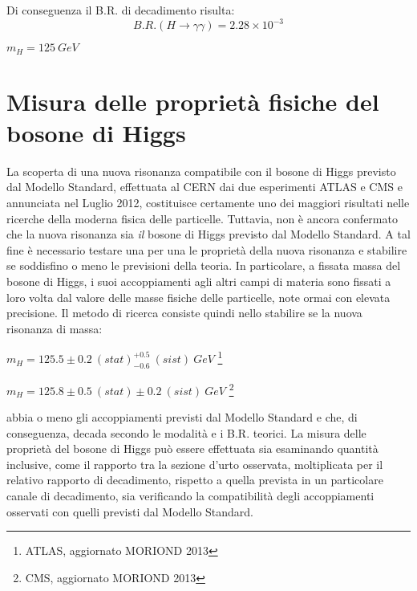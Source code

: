 Di conseguenza il B.R. di decadimento risulta:
\begin{equation}
 B.R.(H\rightarrow\gamma\gamma)= 2.28\times 10^{-3}
\end{equation}
\begin{center}
 $m_{H}=125 ~GeV$
\end{center}

\section{Misura delle proprietà fisiche del bosone di Higgs}
\medskip
La scoperta di una nuova risonanza compatibile con il bosone di Higgs previsto dal Modello Standard, effettuata al \ac{CERN} dai due esperimenti
ATLAS \cite{atlasHiggs} e CMS \cite{cmsHiggs} e annunciata nel Luglio 2012,
costituisce certamente uno dei maggiori risultati nelle ricerche della moderna fisica delle particelle.
\newline
Tuttavia, non è ancora confermato che la nuova risonanza sia \textit{il} bosone di Higgs previsto dal Modello Standard.
A tal fine è necessario testare
una per una le proprietà della nuova risonanza e stabilire se soddisfino o meno le previsioni della teoria.
\newline
In particolare, a fissata massa del bosone di Higgs, i suoi accoppiamenti agli altri campi di materia sono fissati a loro volta
dal valore delle masse fisiche delle particelle, note ormai con elevata precisione.
\newline 
Il metodo di ricerca consiste quindi nello stabilire se la nuova risonanza di massa:
\begin{center}
 $m_{H}=125.5 \pm 0.2 ~(stat) ^{+0.5}_{-0.6} ~(sist) ~GeV$ \footnote{ATLAS, aggiornato MORIOND 2013 }
\end{center}
\begin{center}
$m_{H}=125.8 \pm 0.5 ~(stat) \pm 0.2 ~(sist) ~GeV$ \footnote{CMS, aggiornato MORIOND 2013}
\end{center}
abbia o meno gli accoppiamenti previsti dal Modello Standard e che, di conseguenza, decada secondo le modalità e i B.R. teorici.
\newline
La misura delle proprietà del bosone di Higgs può essere effettuata sia esaminando quantità inclusive, come il rapporto tra la sezione d'urto osservata, moltiplicata per il relativo rapporto di decadimento,
rispetto a quella prevista in un particolare canale di decadimento, sia verificando la compatibilità degli accoppiamenti
osservati con quelli previsti dal Modello Standard.


